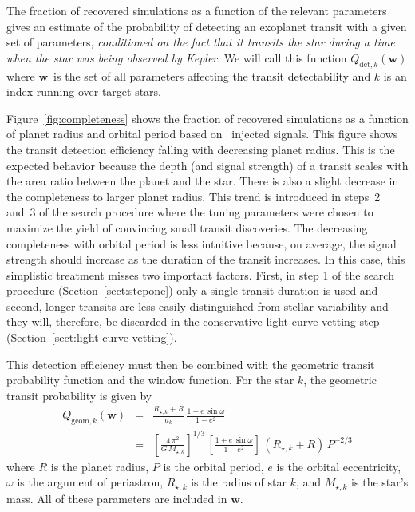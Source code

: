 \documentclass[manuscript, letterpaper]{aastex6}
\newcommand{\dfmfigref}[1]{\ref{fig:#1}}
\newcommand{\dfmFig}[1]{Figure~\dfmfigref{#1}}
\newcommand{\dfmfig}[1]{\dfmFig{#1}}
\newcommand{\sectionname}{Section}
\newcommand{\sectref}[1]{\ref{sect:#1}}
\newcommand{\Sect}[1]{\sectionname~\sectref{#1}}
\newcommand{\sect}[1]{\Sect{#1}}
\newcommand{\bvec}[1]{{\ensuremath{\boldsymbol{#1}}}}
\newcommand{\params}{{\ensuremath{\bvec{w}}}}
\begin{document}
The fraction of recovered simulations as a function of the relevant parameters
gives an estimate of the probability of detecting an exoplanet transit with a
given set of parameters, \emph{conditioned on the fact that it transits the
star during a time when the star was being observed by Kepler}.
We will call this function $Q_{\mathrm{det},k}(\params)$ where \params\ is the
set of all parameters affecting the transit detectability and $k$ is an index
running over target stars.

\dfmfig{completeness} shows the fraction of recovered simulations as a
function of planet radius and orbital period based on \numinjs\ injected
signals.
This figure shows the transit detection efficiency falling with decreasing
planet radius.
This is the expected behavior because the depth (and signal strength) of a
transit scales with the area ratio between the planet and the star.
There is also a slight decrease in the completeness to larger planet radius.
This trend is introduced in steps~2 and~3 of the search procedure where the
tuning parameters were chosen to maximize the yield of convincing small
transit discoveries.
The decreasing completeness with orbital period is less intuitive because, on
average, the signal strength should increase as the duration of the transit
increases.
In this case, this simplistic treatment misses two important factors.
First, in step 1 of the search procedure (\sect{stepone}) only a single
transit duration is used and second, longer transits are less easily
distinguished from stellar variability and they will, therefore, be discarded
in the conservative light curve vetting step (\sect{light-curve-vetting}).

This detection efficiency must then be combined with the geometric transit
probability function and the window function.
For the star $k$, the geometric transit probability is given by
\citep{Winn:2010}
\begin{eqnarray}
Q_{\mathrm{geom},k} (\params) &=& \frac{R_{\star,k} + R}{a_k}
    \, \frac{1 + e\,\sin\omega}{1-e^2} \\
&=& \left[\frac{4\,\pi^2}{G\,M_{\star,k}}\right]^{1/3}
    \, \left[\frac{1 + e\,\sin \omega}{1-e^2}\right]\,(R_{\star,k}+R)
    \, P^{-2/3}
\end{eqnarray}
where $R$ is the planet radius, $P$ is the orbital period, $e$ is the orbital
eccentricity, $\omega$ is the argument of periastron, $R_{\star,k}$ is
the radius of star $k$, and $M_{\star,k}$ is the star's mass.
All of these parameters are included in \params.
\end{document}
